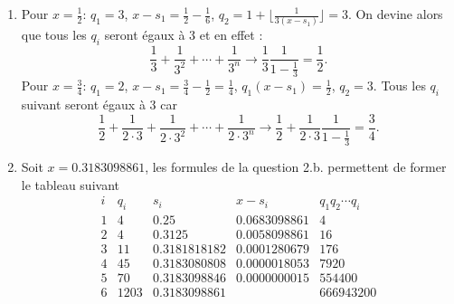 \begin{enumerate}
\begin{enumerate}
\item Si $r$ est le reste de la division de $b$ par $a$, notons $p$ le quotient
\begin{multline*}
  b = pa +r \text{ avec } r\in \llbracket 0, a-1\rrbracket \Rightarrow \frac{b}{a} = p + \underset{\in [0,1[}{\underbrace{\frac{r}{a}}}
\Rightarrow p =\lfloor \frac{b}{a} \rfloor \\
\Rightarrow \beta(\frac{a}{b}) = (p+1)x -1 = \left( \frac{b-r}{a} +1\right)\frac{a}{b} -1 = \frac{b-r+a-b}{b} = \frac{a-r}{b} 
\end{multline*}

\item \`A cause de la question 2.a., on doit seulement montrer que le développement de Engel d'un nombre rationnel est stationnaire. D'après la question précédente, $\beta(\frac{a}{b})$ est rationnel avec le même dénominateur mais un numérateur inférieur ou égal. Il ne peut décroitre indéfiniment, on tombe forcément sur un numérateur qui divise le dénominateur et la suite des $x_n$ est alors stationnaire.
\end{enumerate}

\item Pour $x=\frac{1}{2}$: $q_{1}=3$, $x-s_{1}=\frac{1}{2}-\frac{1}{6}$, $q_{2}=1+\lfloor \frac{1}{3(x-s_{1})}\rfloor=3$. On devine alors que tous les $q_{i}$ seront {\'e}gaux {\`a} 3 et en effet :
\[
\frac{1}{3}+\frac{1}{3^{2}}+\cdots +\frac{1}{3^{n}}\rightarrow \frac{1}{3}\frac{1}{1-\frac{1}{3}}=\frac{1}{2}\mathrm{.}
\]
Pour $x=\frac{3}{4}$: $q_{1}=2$, $x-s_{1}=\frac{3}{4}-\frac{1}{2}=\frac{1}{4}$, $q_{1}(x-s_{1})=\frac{1}{2}$, $q_{2}=3$. Tous les $q_{i}$ suivant seront {\'e}gaux {\`a} 3 car
\[
\frac{1}{2}+\frac{1}{2\cdot 3}+\frac{1}{2\cdot 3^{2}}+\cdots +\frac{1}{2\cdot 3^{n}}\rightarrow \frac{1}{2}+\frac{1}{2\cdot 3}\frac{1}{1-\frac{1}{3}}=\frac{3}{4}\mathrm{.}
\]

\item Soit $x=0.3183098861$, les formules de la question 2.b. permettent de former le tableau suivant
\[
\begin{array}{rrrrr}
i & q_{i} & s_{i} & x-s_{i} & q_{1}q_{2}\cdots q_{i} \\
1 & 4 & 0.25 & 0.0683098861 & 4 \\
2 & 4 & 0.3125 & 0.0058098861 & 16 \\
3 & 11 & 0.3181818182 & 0.0001280679 & 176 \\
4 & 45 & 0.3183080808 & 0.0000018053 & 7920 \\
5 & 70 & 0.3183098846 & 0.0000000015 & 554400 \\
6 & 1203 & 0.3183098861 &  & 666943200
\end{array}
\]
\end{enumerate}
